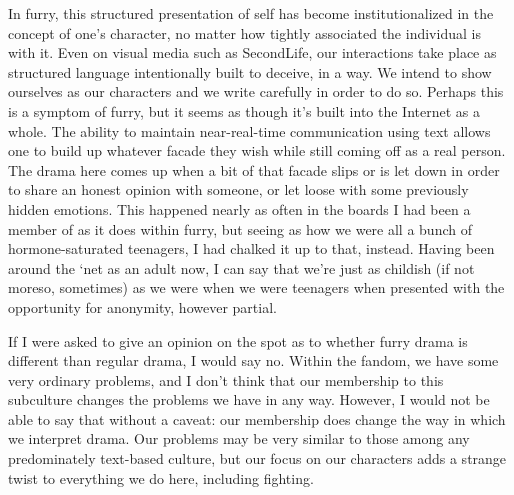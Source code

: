 In furry, this structured presentation of self has become institutionalized in the concept of one's character, no matter how tightly associated the individual is with it.  Even on visual media such as SecondLife, our interactions take place as structured language intentionally built to deceive, in a way. We intend to show ourselves as our characters and we write carefully in order to do so.  Perhaps this is a symptom of furry, but it seems as though it's built into the Internet as a whole. The ability to maintain near-real-time communication using text allows one to build up whatever facade they wish while still coming off as a real person. The drama here comes up when a bit of that facade slips or is let down in order to share an honest opinion with someone, or let loose with some previously hidden emotions. This happened nearly as often in the boards I had been a member of as it does within furry, but seeing as how we were all a bunch of hormone-saturated teenagers, I had chalked it up to that, instead. Having been around the ‘net as an adult now, I can say that we're just as childish (if not moreso, sometimes) as we were when we were teenagers when presented with the opportunity for anonymity, however partial.

If I were asked to give an opinion on the spot as to whether furry drama is different than regular drama, I would say no.  Within the fandom, we have some very ordinary problems, and I don't think that our membership to this subculture changes the problems we have in any way.  However, I would not be able to say that without a caveat: our membership does change the way in which we interpret drama. Our problems may be very similar to those among any predominately text-based culture, but our focus on our characters adds a strange twist to everything we do here, including fighting.
